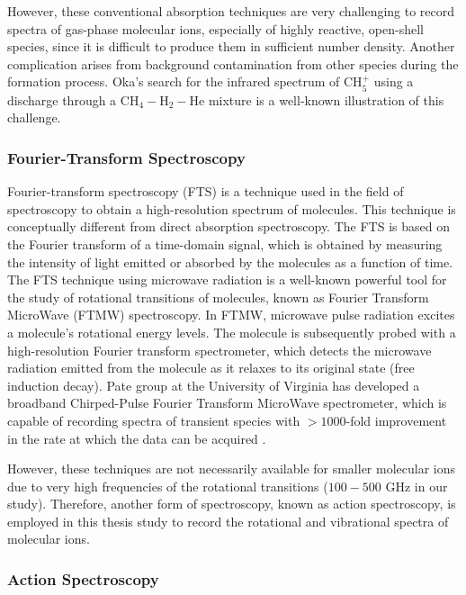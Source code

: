 However, these conventional absorption techniques are very challenging to
record spectra of gas-phase molecular ions, especially of highly reactive,
open-shell species, since it is difficult to produce them in sufficient
number density. Another complication arises from background contamination from
other species during the formation process. Oka's \cite{oka_taming_2015} search
for the infrared spectrum of CH$_5^+$ using a discharge through a
CH$_4-$H$_2-$He mixture is a well-known illustration of this challenge.

\subsubsection*{Fourier-Transform Spectroscopy}
Fourier-transform spectroscopy (FTS) is a technique used in the field of spectroscopy to obtain a high-resolution spectrum of molecules. 
This technique is conceptually different from direct absorption spectroscopy.
The FTS is based on the Fourier transform of a time-domain signal, which is obtained by 
measuring the intensity of light emitted or absorbed by the molecules as a function of time.
The FTS technique using microwave radiation is a well-known powerful tool for the study of rotational transitions of molecules, known as Fourier Transform MicroWave (FTMW) spectroscopy. In FTMW, microwave pulse radiation excites a molecule's rotational energy levels. The molecule is subsequently probed with a high-resolution Fourier transform spectrometer, which detects the microwave radiation emitted from the molecule as it relaxes to its original state (free induction decay). 
Pate group at the University of Virginia has developed a broadband Chirped-Pulse Fourier Transform MicroWave  spectrometer, which is capable of recording spectra of transient species with $>1000$-fold improvement in the rate at which the data can be acquired \cite{brown_rotational_2006, brown_broadband_2008, park_perspective_2016}.

However, these techniques are not necessarily available for smaller molecular ions due to 
very high frequencies of the rotational transitions ($100-500 $ GHz in our study).
Therefore, another form of spectroscopy, known as action spectroscopy, is employed in this thesis study to record the rotational and vibrational spectra of molecular ions.

\subsubsection*{Action Spectroscopy}


